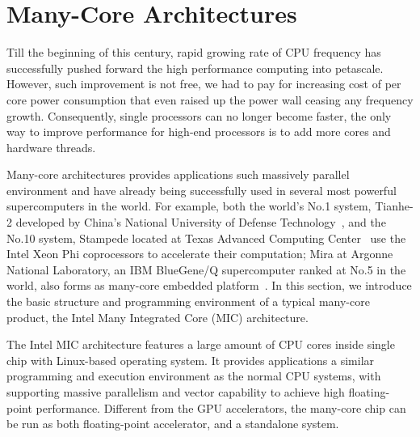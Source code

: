 \section{Many-Core Architectures}\label{sec:back-manycore}
Till the beginning of this century, rapid growing rate of CPU frequency
has successfully pushed forward the high performance computing into
petascale. However, such improvement is not free, we had to pay for
increasing cost of per core power consumption that even raised up the
power wall ceasing any frequency growth. Consequently, single processors
can no longer become faster, the only way to improve performance for
high-end processors is to add more cores and hardware threads.

Many-core architectures provides applications such massively parallel
environment and have already being successfully used in several most
powerful supercomputers in the world. For example, both the world's No.1 system,
Tianhe-2 developed by China's National University of Defense
Technology~\cite{tianhe2}, and the No.10 system, Stampede located at Texas
Advanced Computing Center~\cite{stampede} use the Intel Xeon Phi coprocessors
to accelerate their computation; Mira at Argonne National Laboratory, an IBM
BlueGene/Q supercomputer ranked at No.5 in the world, also forms as
many-core embedded platform~\cite{mira}.
In this section, we introduce the basic structure and programming
environment of a typical many-core product, the Intel Many Integrated
Core (MIC) architecture.


The Intel MIC architecture features a large amount
of CPU cores inside single chip with Linux-based operating system. It
provides applications a similar programming and execution environment
as the normal CPU systems, with supporting massive parallelism and vector
capability to achieve high floating-point performance. Different from
the GPU accelerators, the many-core chip can be run as both floating-point
accelerator, and a standalone system.

